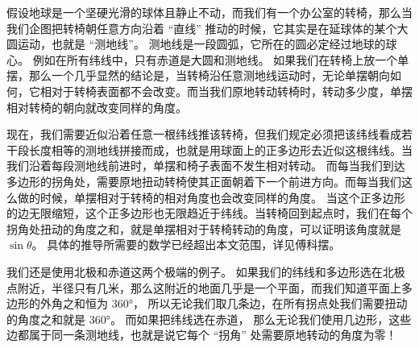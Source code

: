 假设地球是一个坚硬光滑的球体且静止不动，而我们有一个办公室的转椅，那么当我们企图把转椅朝任意方向沿着 “直线” 推动的时候，它其实是在延球体的某个大圆运动，也就是 “测地线”。 测地线是一段圆弧，它所在的圆必定经过地球的球心。 例如在所有纬线中，只有赤道是大圆和测地线。 如果我们在转椅上放一个单摆，那么一个几乎显然的结论是，当转椅沿任意测地线运动时，无论单摆朝向如何，它相对于转椅表面都不会改变。而当我们原地转动转椅时，转动多少度，单摆相对转椅的朝向就改变同样的角度。

现在，我们需要近似沿着任意一根纬线推该转椅，但我们规定必须把该纬线看成若干段长度相等的测地线拼接而成，也就是用球面上的正多边形去近似这根纬线。当我们沿着每段测地线前进时，单摆和椅子表面不发生相对转动。 而每当我们到达多边形的拐角处，需要原地扭动转椅使其正面朝着下一个前进方向。而每当我们这么做的时候，单摆相对于转椅的相对角度也会改变同样的角度。 当这个正多边形的边无限缩短，这个正多边形也无限趋近于纬线。当转椅回到起点时，我们在每个拐角处扭动的角度之和，就是单摆相对于转椅转动的角度，可以证明该角度就是 $\sin\theta$。 具体的推导所需要的数学已经超出本文范围，详见傅科摆。

我们还是使用北极和赤道这两个极端的例子。 如果我们的纬线和多边形选在北极点附近，半径只有几米，那么这附近的地面几乎是一个平面，而我们知道平面上多边形的外角之和恒为 360°， 所以无论我们取几条边，在所有拐点处我们需要扭动的角度之和就是 360°。 而如果把纬线选在赤道， 那么无论我们使用几边形，这些边都属于同一条测地线，也就是说它每个 “拐角” 处需要原地转动的角度为零！
